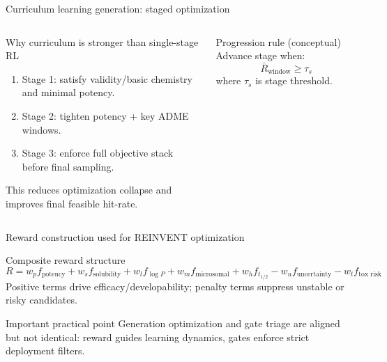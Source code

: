 \documentclass[aspectratio=169,10pt]{beamer}
\begin{document}
\begin{frame}{Curriculum learning generation: staged optimization}
  \small
  \begin{columns}[T]
      \begin{block}{Why curriculum is stronger than single-stage RL}
        \begin{enumerate}
          \item Stage 1: satisfy validity/basic chemistry and minimal potency.
          \item Stage 2: tighten potency + key ADME windows.
          \item Stage 3: enforce full objective stack before final sampling.
        \end{enumerate}
        This reduces optimization collapse and improves final feasible hit-rate.
      \end{block}
      \begin{block}{Progression rule (conceptual)}
        Advance stage when:
        \[
        \bar{R}_{\text{window}} \ge \tau_s
        \]
        where \(\tau_s\) is stage threshold.
      \end{block}
  \end{columns}
\end{frame}

\begin{frame}{Reward construction used for REINVENT optimization}
  \small
  \begin{block}{Composite reward structure}
    \[
      R = w_p f_{\text{potency}} +
          w_s f_{\text{solubility}} +
          w_l f_{\log P} +
          w_m f_{\text{microsomal}} +
          w_h f_{t_{1/2}} -
          w_u f_{\text{uncertainty}} -
          w_t f_{\text{tox risk}}
    \]
    Positive terms drive efficacy/developability; penalty terms suppress unstable or risky candidates.
  \end{block}

  \begin{alertblock}{Important practical point}
    Generation optimization and gate triage are aligned but not identical:
    reward guides learning dynamics, gates enforce strict deployment filters.
  \end{alertblock}
\end{frame}
\end{document}
